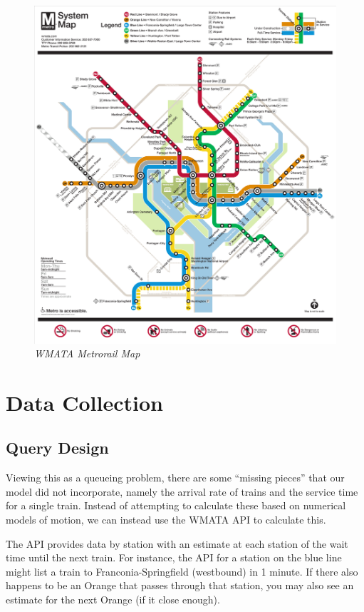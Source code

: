 \documentclass[a4paper,12pt]{article}
\begin{document}
\begin{figure}
\begin{center}
\includegraphics[width=5in]{../images/metro_map.pdf}
\caption{\small \sl WMATA Metrorail Map \label{fig:metromap} \cite{fioroni}}
\end{center}
\end{figure}

\section{Data Collection}

\subsection{Query Design}
Viewing this as a queueing problem, there are some ``missing pieces'' that our model did not incorporate, namely the
arrival rate of trains and the service time for a single train. Instead of attempting to calculate these based on 
numerical models of motion, we can instead use the WMATA API \cite{wmataapi} to calculate this.

The API provides data by station with an estimate at each station of the wait time until the next train. For instance,
the API for a station on the blue line might list a train to Franconia-Springfield (westbound) in 1 minute. If there
also happens to be an Orange that passes through that station, you may also see an estimate for the next Orange (if it
close enough).
\end{document}

